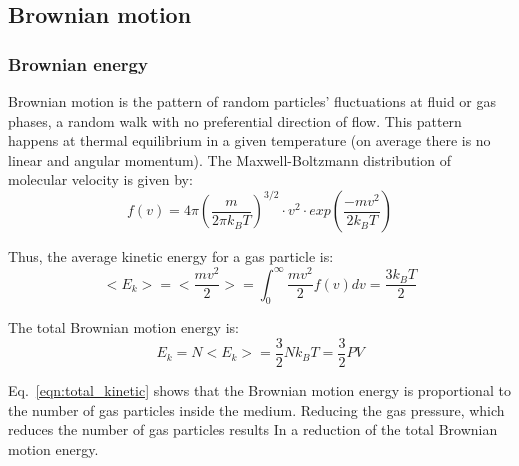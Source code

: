 \documentclass[\main/master.tex]{subfiles}
\begin{document}
\subsection{Brownian motion}
\subsubsection{Brownian energy}
Brownian motion is the pattern of random particles' fluctuations at fluid or gas phases, a random walk with no preferential direction of flow. This pattern happens at thermal equilibrium in a given temperature (on average there is no linear and angular momentum). The Maxwell-Boltzmann distribution of molecular velocity is given by:
\begin{equation}
f(v) = 4\pi(\frac{m}{2 \pi k_B T})^{3/2}\cdot v^2\cdot exp(\frac{-mv^2}{2k_BT})     \label{eqn:Maxwell_Boltzmann}
\end{equation} 
\par\noindent 
Thus, the average kinetic energy for a gas particle is: 
\begin{equation}
<E_k>=<\frac{mv^2}{2}> = \int_{0}^{\infty}\frac{mv^2}{2}f(v)dv =  \frac{3k_BT}{2}    \label{eqn:average kinetic}
\end{equation}
\par\noindent
The total Brownian motion energy is:
\begin{equation}
E_k = N<E_k> =\frac{3}{2}N k_B T = \frac{3}{2}PV    \label{eqn:total_kinetic}
\end{equation}
\par\noindent
Eq.~\ref{eqn:total_kinetic} shows that the Brownian motion energy is proportional to the number of gas particles inside the medium. Reducing the gas pressure, which reduces the number of gas particles results In a reduction of the total Brownian motion energy. 
\end{document}
